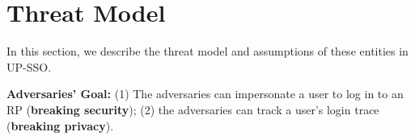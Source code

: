 \section{Threat Model}
\label{sec:threatmodel}
In this section, we describe the threat model and assumptions of these entities in UP-SSO.

\vspace{1mm}\noindent\textbf{Adversaries' Goal: }(1) The adversaries can impersonate a user to log in to an RP (\textbf{breaking security}); (2) the adversaries can track a user's login trace (\textbf{breaking privacy}).
\begin{comment}
\item \noindent\textbf{Breaking the security. }The adversaries can impersonate an honest user to log in to the honest RP.
\item \noindent\textbf{Breaking the privacy. }The adversaries can track a user's login trace on each RP.
\end{comment} 

